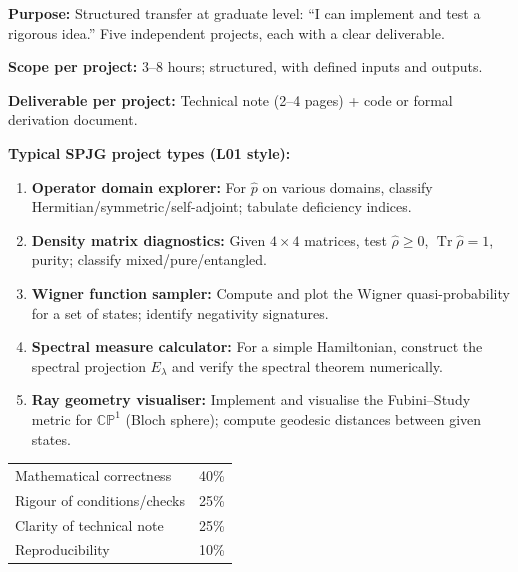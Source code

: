 \documentclass[11pt,a4paper]{article}
\begin{document}
\begin{tcolorbox}[gradprobbox, title={SPJG --- Simple Projects, Graduate \hfill\normalfont 5 projects}]

\textbf{Purpose:} Structured transfer at graduate level: ``I can implement and test a
rigorous idea.'' Five independent projects, each with a clear deliverable.

\medskip\textbf{Scope per project:} 3--8 hours; structured, with defined inputs and outputs.

\medskip\textbf{Deliverable per project:} Technical note (2--4 pages) + code or
formal derivation document.

\medskip\textbf{Typical SPJG project types (L01 style):}
\begin{enumerate}[leftmargin=2em,itemsep=4pt]
  \item \textbf{Operator domain explorer:} For $\hat{p}$ on various domains, classify
        Hermitian/symmetric/self-adjoint; tabulate deficiency indices.
  \item \textbf{Density matrix diagnostics:} Given $4\times 4$ matrices, test
        $\hat{\rho}\ge 0$, $\operatorname{Tr}\hat{\rho}=1$, purity; classify mixed/pure/entangled.
  \item \textbf{Wigner function sampler:} Compute and plot the Wigner quasi-probability
        for a set of states; identify negativity signatures.
  \item \textbf{Spectral measure calculator:} For a simple Hamiltonian, construct the
        spectral projection $E_\lambda$ and verify the spectral theorem numerically.
  \item \textbf{Ray geometry visualiser:} Implement and visualise the Fubini--Study
        metric for $\mathbb{CP}^1$ (Bloch sphere); compute geodesic distances between
        given states.
\end{enumerate}
\end{tcolorbox}

\begin{tcolorbox}[rubricbox, title={SPJG Rubric (per project)}]
\begin{tabular}{ll}
  Mathematical correctness               & 40\%\\
  Rigour of conditions/checks            & 25\%\\
  Clarity of technical note              & 25\%\\
  Reproducibility                        & 10\%\\
\end{tabular}
\end{tcolorbox}
\end{document}
